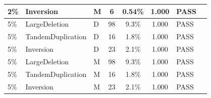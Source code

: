 \begin{table}[h]
\begin{tabular}{lllcccll}
    2\%   & Inversion         & M & 6  & 0.54\% & 1.000 & PASS    & \\
    \midrule
    5\%   & LargeDeletion     & D & 98 & 9.3\%  & 1.000 & PASS    & \\
    5\%   & TandemDuplication & D & 16 & 1.8\%  & 1.000 & PASS    & \\
    5\%   & Inversion         & D & 23 & 2.1\%  & 1.000 & PASS    & \\
    5\%   & LargeDeletion     & M & 98 & 9.3\%  & 1.000 & PASS    & \\
    5\%   & TandemDuplication & M & 16 & 1.8\%  & 1.000 & PASS    & \\
    5\%   & Inversion         & M & 23 & 2.1\%  & 1.000 & PASS    & \\
    \bottomrule
  \end{tabular}
\end{table}


